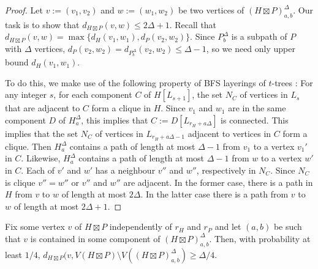 \documentclass{patmorin}
\renewcommand{\ge}{\geqslant}
\renewcommand{\le}{\leqslant}
\newcommand{\david}[1]{{\color{orange} David: #1}}
\newcommand{\pat}[1]{\textcolor{Blue}{Pat: #1}}
\begin{document}
\begin{proof}
  Let $v:=(v_1,v_2)$ and $w:=(w_1,w_2)$ be two vertices of $(H\boxtimes P)^\Delta_{a,b}$.  Our task is to show that $d_{H\boxtimes P}(v,w)\le 2\Delta+1$.  Recall that
  $d_{H\boxtimes P}(v,w)=\max\{d_{H}(v_1,w_1),d_{P}(v_2,w_2)\}$.  Since $P^\Delta_b$ is a subpath of $P$ with $\Delta$ vertices, $d_P(v_2,w_2)=d_{P^\Delta_b}(v_2,w_2)\le\Delta-1$, so we need only upper bound $d_{H}(v_1,w_1)$.

  To do this, we make use of the following property of BFS layerings of $t$-trees \cite{KP08,DMW05}:
  For any integer $s$,
  for each component $C$ of $H[L_{s+1}]$,
    the set $N_C$ of vertices in $L_{s}$ that are adjacent to $C$ form a clique in $H$.
  Since $v_1$ and $w_1$ are in the same component $D$ of $H^\Delta_a$, this implies that $C:=D[L_{r_H+a\Delta}]$ is connected.  This implies that the set $N_C$ of vertices in $L_{r_H+a\Delta-1}$ adjacent to vertices in $C$ form a clique.  Then $H^\Delta_a$ contains a path of length at most $\Delta-1$ from $v_1$ to a vertex $v_1'$ in $C$.   Likewise, $H^\Delta_a$ contains a path of length at most $\Delta-1$ from $w$ to a vertex $w'$ in $C$. Each of $v'$ and $w'$ has a neighbour $v''$ and $w''$, respectively in $N_C$.  Since $N_C$ is clique $v''=w''$ or $v''$ and $w''$ are adjacent.  In the former case, there is a path in $H$ from $v$ to $w$ of length at most $2\Delta$. In the latter case there is a path from $v$ to $w$ of length at most $2\Delta+1$.
\end{proof}

\begin{lem}\label{good_probability}
  Fix some vertex $v$ of $H\boxtimes P$ independently of $r_H$ and $r_P$ and let $(a,b)$ be such that $v$ is contained in some component of $(H\boxtimes P)^\Delta_{a,b}$.  Then, with probability at least $1/4$,  $d_{H\boxtimes P}(v, V(H\boxtimes P)\setminus V((H\boxtimes P)^\Delta_{a,b})\ge \Delta/4$.
\end{lem}
\end{document}
